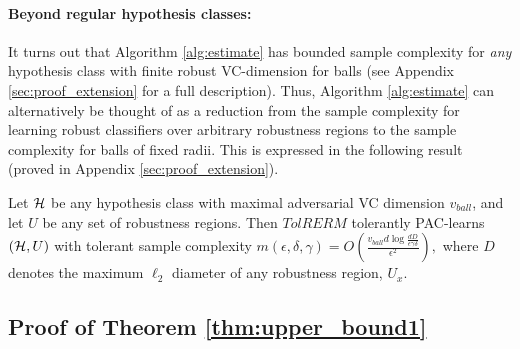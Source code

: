 \paragraph{Beyond regular hypothesis classes:} It turns out that Algorithm \ref{alg:estimate} has bounded sample complexity for \textit{any} hypothesis class with finite robust VC-dimension for balls (see Appendix \ref{sec:proof_extension} for a full description).
Thus, Algorithm \ref{alg:estimate} can alternatively be thought of as a reduction from the sample complexity for learning robust classifiers over arbitrary robustness regions to the sample complexity for balls of fixed radii. This is expressed in the following result (proved in Appendix \ref{sec:proof_extension}). 

\begin{thm}\label{thm:upper_bound_general}
Let $\mathcal H$ be any hypothesis class with maximal adversarial VC dimension $v_{ball}$, and let $U$ be any set of robustness regions. Then $TolRERM$ tolerantly PAC-learns $(\mathcal H, U)$ with tolerant sample complexity $m(\epsilon, \delta, \gamma)  = O\left( \frac{v_{ball}d\log \frac{dD}{\epsilon\gamma\delta}}{\epsilon^2}\right),$ where $D$ denotes the maximum $\ell_2$ diameter of any robustness region, $U_x$. 
\end{thm}

\subsection{Proof of Theorem \ref{thm:upper_bound1}}

